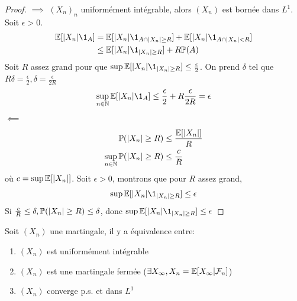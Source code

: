 \documentclass[]{report}
\begin{document}
    \begin{proof}
        $\implies$ $(X_n)_n$ uniformément intégrable, alors $(X_n)$ est bornée dans $L^1$. Soit $\epsilon >0$.
        \begin{align*}
            \Ea[|X_n|\1_{A}]&=\Ea[|X_n|\1_{A\cap |X_n|\ge R}]+\Ea[|X_n|\1_{A\cap |X_n|< R}]\\
            &\le \Ea[|X_n|\1_{|X_n|\ge R}]+R\Pa(A)
        \end{align*}
        Soit $R$ assez grand pour que $\sup\Ea[|X_n|\1_{|X_n|\ge R}]\le \frac{\epsilon}{2}$. On prend $\delta$ tel que $R\delta=\frac{\epsilon}{2}, \delta=\frac{\epsilon}{2R}$
        \[\sup_{\nN}\Ea[|X_n|\1_{A}]\le \frac{\epsilon }{2}+R\frac{\epsilon}{2R}=\epsilon\]
        $\impliedby$
        \begin{align*}
            \mathbb{P}(|X_n|\ge R)&\le \frac{\mathbb{E}[|X_n|]}{R}\\
            \sup_{n\in\mathbb{N}}\mathbb{P}(|X_n|\ge R)&\le \frac{c}{R}
        \end{align*}
        où $c=\sup \mathbb{E}[|X_n|]$.
        Soit $\epsilon>0$, montrons que pour $R$ assez grand,
        \[\sup \Ea[|X_n|\1_{|X_n|\ge R}]\le \epsilon\]
        Si $\frac{c}{R}\le \delta,\mathbb{P}(|X_n|\ge R)\le \delta$, donc $\sup\Ea[|X_n|\1_{|X_n|\ge R}]\le \epsilon$
    \end{proof}

    \begin{tm}{}{}
        Soit $(X_n)$ une martingale, il y a équivalence entre:
        \begin{enumerate}
            \item $(X_n)$ est uniformément intégrable
            \item $(X_n)$ est une martingale fermée ($\exists X_\infty,X_n=\mathbb{E}[X_\infty|\mathcal{F}_n]$)
            \item $(X_n)$ converge p.s. et dans $L^1$
        \end{enumerate}
    \end{tm}
\end{document}
